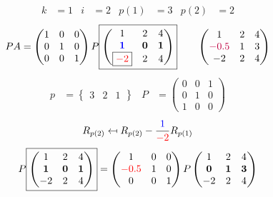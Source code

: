 \documentclass[pdf]{beamer}
\begin{document}
\begin{frame}{}\begin{align*} k &= 1 & i &= 2 & p(1) &= 3 & p(2) &= 2\end{align*} $$PA=\begin{pmatrix}1&0&0\\0&1&0\\0&0&1\end{pmatrix} P \boxed{\begin{pmatrix}1&2&4\\\mathbf{{\color{blue}1}}&\mathbf{0}&\mathbf{1}\\\boxed{{\color{red}-2}}&2&4\end{pmatrix}} \quad\quad \begin{pmatrix}1&2&4\\{\color{purple}-0.5}&1&3\\-2&2&4\end{pmatrix}$$ \begin{align*} p&= \begin{Bmatrix}3&2&1\end{Bmatrix} & P&= \begin{pmatrix}0&0&1\\0&1&0\\1&0&0\end{pmatrix} \end{align*} $$R_{p(2)} \mapsfrom R_{p(2)} - \frac{{\color{blue}1}}{{\color{red}-2}} R_{p(1)}$$ $$ P \boxed{\begin{pmatrix}1&2&4\\\mathbf{1}&\mathbf{0}&\mathbf{1}\\-2&2&4\end{pmatrix}} = \begin{pmatrix}1&0&0\\{\color{red}-0.5}&1&0\\0&0&1\end{pmatrix} P \begin{pmatrix}1&2&4\\\mathbf{0}&\mathbf{1}&\mathbf{3}\\-2&2&4\end{pmatrix} $$\end{frame}
\end{document}
